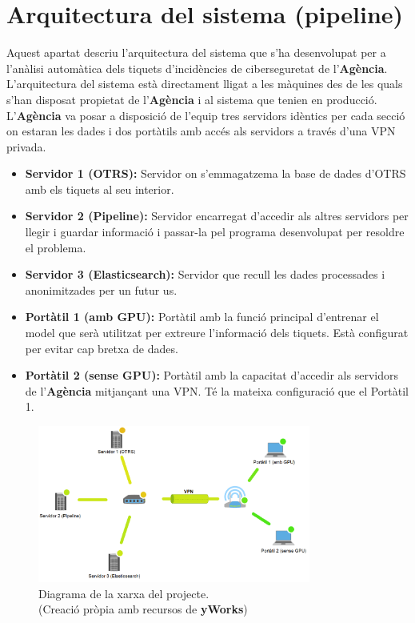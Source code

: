 \section{Arquitectura del sistema (pipeline)}
Aquest apartat descriu l'arquitectura del sistema que s'ha desenvolupat per a l'anàlisi automàtica dels tiquets d'incidències de ciberseguretat de l'\textbf{Agència}. L'arquitectura del sistema està directament lligat a les màquines des de les quals s'han disposat propietat de l'\textbf{Agència} i al sistema que tenien en producció. L'\textbf{Agència} va posar a disposició de l'equip tres servidors idèntics per cada secció on estaran les dades i dos portàtils amb accés als servidors a través d'una VPN privada.

\begin{itemize}
     \item \textbf{Servidor 1 (OTRS):} Servidor on s'emmagatzema la base de dades d'OTRS amb els tiquets al seu interior.
     \item \textbf{Servidor 2 (Pipeline):} Servidor encarregat d'accedir als altres servidors per llegir i guardar informació i passar-la pel programa desenvolupat per resoldre el problema.
     \item \textbf{Servidor 3 (Elasticsearch):} Servidor que recull les dades processades i anonimitzades per un futur us.
\end{itemize}

\begin{itemize}
     \item \textbf{Portàtil 1 (amb GPU):} Portàtil amb la funció principal d'entrenar el model que serà utilitzat per extreure l'informació dels tiquets. Està configurat per evitar cap bretxa de dades.
     \item \textbf{Portàtil 2 (sense GPU):} Portàtil amb la capacitat d'accedir als servidors de l'\textbf{Agència} mitjançant una VPN. Té la mateixa configuració que el Portàtil 1.
\end{itemize}

\begin{figure}[H]
     \centering
     \includegraphics[width=0.8\textwidth]{network.png}
     \caption[Diagrama de la xarxa del projecte]{Diagrama de la xarxa del projecte. \\ (Creació pròpia amb recursos de \textbf{yWorks})}
     \label{fig:network}
\end{figure}

